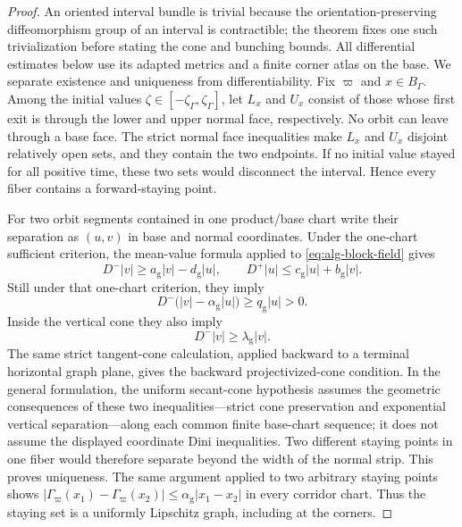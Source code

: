 \documentclass[11pt]{amsart}
\numberwithin{equation}{section}
\theoremstyle{definition}
\theoremstyle{remark}
\begin{document}
\begin{proof}
An oriented interval bundle is trivial because the orientation-preserving
diffeomorphism group of an interval is contractible; the theorem fixes one
such trivialization before stating the cone and bunching bounds.  All
differential estimates below use its adapted metrics and a finite corner
atlas on the base.  We separate
existence and uniqueness from differentiability.  Fix
$\varpi$ and $x\in B_\Gamma$.  Among the initial values
$\zeta\in[-\zeta_\Gamma,\zeta_\Gamma]$, let $L_x$ and $U_x$ consist of
those whose first exit is through the lower and upper normal face,
respectively.  No orbit can leave through a base face.  The strict normal
face inequalities make $L_x$ and $U_x$ disjoint relatively open sets, and
they contain the two endpoints.  If no initial value stayed for all
positive time, these two sets would disconnect the interval.  Hence every
fiber contains a forward-staying point.

For two orbit segments contained in one product/base chart write their separation
as $(u,v)$ in base and normal coordinates.  Under the one-chart sufficient
criterion, the mean-value formula applied to
\eqref{eq:alg-block-field} gives
\begin{equation}\label{eq:corridor-cone-dini-bounds}
 D^-|v|\ge a_{\mathrm g}|v|-d_{\mathrm g}|u|,
 \qquad
 D^+|u|\le c_{\mathrm g}|u|+b_{\mathrm g}|v|.
\end{equation}
Still under that one-chart criterion, they imply
\begin{equation}\label{eq:corridor-cone-invariance}
 D^-\bigl(|v|-\alpha_{\mathrm g}|u|\bigr)
 \ge q_{\mathrm g}|u|>0.
\end{equation}
Inside the vertical cone they also imply
\begin{equation}\label{eq:corridor-vertical-growth}
 D^-|v|\ge\lambda_{\mathrm g}|v|.
\end{equation}
The same strict tangent-cone calculation, applied backward to a terminal
horizontal graph plane, gives the backward projectivized-cone condition.
In the general formulation, the uniform secant-cone hypothesis assumes
the geometric consequences of these two inequalities---strict cone
preservation and exponential vertical separation---along each common
finite base-chart sequence; it does not assume the displayed coordinate
Dini inequalities.  Two different staying points in one fiber would therefore separate beyond
the width of the normal strip.  This proves uniqueness.  The same argument
applied to two arbitrary staying points shows
$|\Gamma_\varpi(x_1)-\Gamma_\varpi(x_2)|\le
\alpha_{\mathrm g}|x_1-x_2|$ in every corridor chart.  Thus the staying set
is a uniformly Lipschitz graph, including at the corners.


\end{proof}
\end{document}
